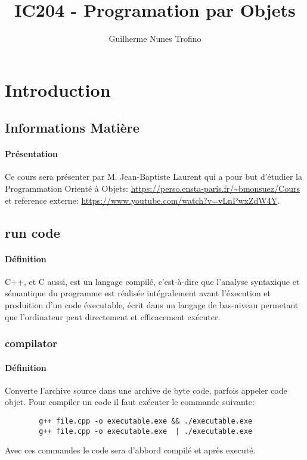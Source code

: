 \documentclass{article}
\title{IC204 - Programation par Objets}
\author{Guilherme Nunes Trofino}
\begin{document}
\maketitle

\newpage\tableofcontents

\section{Introduction}

% 
% 


\subsection{Informations Matière}
\paragraph{Présentation}Ce cours sera présenter par M. Jean-Baptiste Laurent qui a pour but d'étudier la Programmation Orienté à Objets: \url{https://perso.ensta-paris.fr/~bmonsuez/Cours} et reference externe: \url{https://www.youtube.com/watch?v=vLnPwxZdW4Y}.

\subsection{run code}
\paragraph{Définition}C++, et C aussi, est un langage compilé, c'est-à-dire que l'analyse syntaxique et sémantique du programme est réalisée intégralement avant l'éxecution et produition d'un code éxecutable, écrit dans un langage de bas-niveau permetant que l'ordinateur peut directement et efficacement exécuter.\\

\subsubsection{compilator}
\paragraph{Définition}Converte l'archive source dans une archive de byte code, parfois appeler code objet. Pour compiler un code il faut exécuter le commande suivante:
\begin{scriptsize}
    \mycode
    \begin{lstlisting}
        g++ file.cpp -o executable.exe && ./executable.exe
        g++ file.cpp -o executable.exe  | ./executable.exe
    \end{lstlisting}
\end{scriptsize}
Avec ces commandes le code sera d'abbord compilé et après executé.
\end{document}
